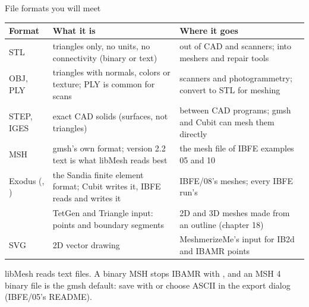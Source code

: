 \documentclass[aspectratio=169,11pt]{beamer}
\begin{document}
\begin{frame}{File formats you will meet}
\scriptsize
\begin{tabular}{@{}L{0.13\textwidth}L{0.44\textwidth}L{0.36\textwidth}@{}}
\toprule
Format & What it is & Where it goes\\
\midrule
STL & triangles only, no units, no connectivity (binary or text) & out of CAD and scanners; into meshers and repair tools\\
OBJ, PLY & triangles with normals, colors or texture; PLY is common for scans & scanners and photogrammetry; convert to STL for meshing\\
STEP, IGES & exact CAD solids (surfaces, not triangles) & between CAD programs; gmsh and Cubit can mesh them directly\\
MSH & gmsh's own format; version 2.2 text is what libMesh reads best & the mesh file of IBFE examples 05 and 10\\
Exodus (, ) & the Sandia finite element format; Cubit writes it, IBFE reads and writes it & IBFE/08's meshes; every IBFE run's \\
 & TetGen and Triangle input: points and boundary segments & 2D and 3D meshes made from an outline (chapter 18)\\
SVG & 2D vector drawing & MeshmerizeMe's input for IB2d and IBAMR points\\
\bottomrule
\end{tabular}
\vspace{2mm}
\begin{punchbox}
\small libMesh reads text files. A binary MSH stops IBAMR with , and an MSH 4 binary file is the gmsh default: save with  or choose ASCII in the export dialog (IBFE/05's README).
\end{punchbox}
\end{frame}
\end{document}
